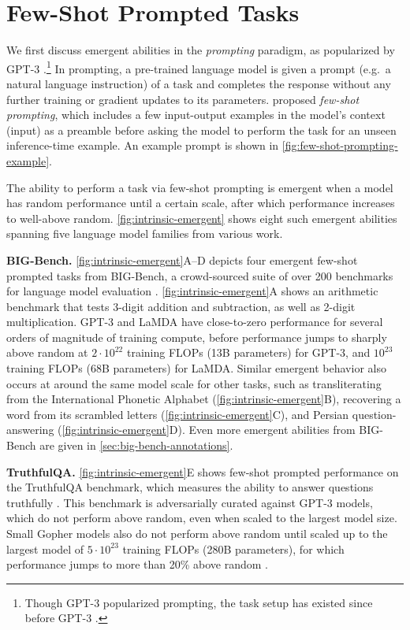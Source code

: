 \section{Few-Shot Prompted Tasks}\label{sec:emergent-prompting}

We first discuss emergent abilities in the \textit{prompting} paradigm, as popularized by GPT-3 \citep{brown2020language}.\footnote{Though GPT-3 popularized prompting, the task setup has existed since before GPT-3  \citep{trinh2018simple,mccann2018natural,radford2019language,raffel2020exploring}.} In prompting, a pre-trained language model is given a prompt (e.g.\ a natural language instruction) of a task and completes the response without any further training or gradient updates to its parameters.
\citet{brown2020language} proposed \textit{few-shot prompting}, which includes a few input-output examples in the model's context (input) as a preamble before asking the model to perform the task for an unseen inference-time example. An example prompt is shown in \ref{fig:few-shot-prompting-example}.

The ability to perform a task via few-shot prompting is emergent when a model has random performance until a certain scale, after which performance increases to well-above random.
\ref{fig:intrinsic-emergent} shows eight such emergent abilities spanning five language model families from various work.

\textbf{BIG-Bench.}
\ref{fig:intrinsic-emergent}A--D depicts four emergent few-shot prompted tasks from BIG-Bench, a crowd-sourced suite of over 200 benchmarks for language model evaluation \citep{bigbench}.
\ref{fig:intrinsic-emergent}A shows an arithmetic benchmark that tests 3-digit addition and subtraction, as well as 2-digit multiplication. GPT-3 and LaMDA \citep{thoppilan2022lamda} have close-to-zero performance for several orders of magnitude of training compute, before performance jumps to sharply above random at $2 \cdot 10^{22}$ training FLOPs (13B parameters) for GPT-3, and $10^{23}$ training FLOPs (68B parameters) for LaMDA. Similar emergent behavior also occurs at around the same model scale for other tasks, such as transliterating from the International Phonetic Alphabet (\ref{fig:intrinsic-emergent}B), recovering a word from its scrambled letters (\ref{fig:intrinsic-emergent}C), and Persian question-answering (\ref{fig:intrinsic-emergent}D).
Even more emergent abilities from BIG-Bench are given in \ref{sec:big-bench-annotations}.

\textbf{TruthfulQA.}
\ref{fig:intrinsic-emergent}E shows few-shot prompted performance on the TruthfulQA benchmark, which measures the ability to answer questions truthfully \citep{lin2021truthfulqa}. This benchmark is adversarially curated against GPT-3 models, which do not perform above random, even when scaled to the largest model size. Small Gopher models also do not perform above random until scaled up to the largest model of $5 \cdot 10^{23}$ training FLOPs (280B parameters), for which performance jumps to more than 20\% above random \citep{rae2021scaling}.

